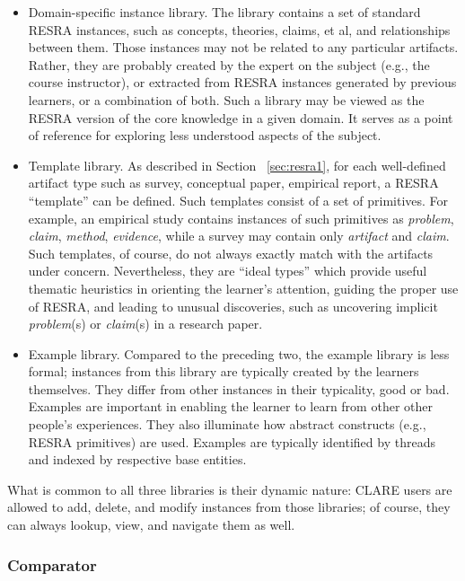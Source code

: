 \begin{itemize}
\item Domain-specific instance library. The library contains a set of
  standard RESRA instances, such as concepts, theories, claims, et al, and
  relationships between them. Those instances may not be related to any
  particular artifacts. Rather, they are probably created by the expert on
  the subject (e.g., the course instructor), or extracted from RESRA
  instances generated by previous learners, or a combination of both. Such
  a library may be viewed as the RESRA version of the core knowledge in a
  given domain.  It serves as a point of reference for exploring less
  understood aspects of the subject.
  
\item Template library. As described in Section ~\ref{sec:resra1}, for
  each well-defined artifact type such as survey, conceptual paper,
  empirical report, a RESRA ``template'' can be defined. Such templates
  consist of a set of primitives. For example, an empirical study contains
  instances of such primitives as {\it problem\/}, {\it claim\/}, {\it
  method\/}, {\it evidence\/}, while a survey may contain only {\it
  artifact\/} and {\it claim\/}. Such templates, of course, do not always
  exactly match with the artifacts under concern.  Nevertheless, they are
  ``ideal types'' which provide useful thematic heuristics in orienting the
  learner's attention, guiding the proper use of RESRA, and leading to
  unusual discoveries, such as uncovering implicit {\it problem\/}(s) or
  {\it claim\/}(s) in a research paper.
  
\item Example library. Compared to the preceding two, the example library
  is less formal; instances from this library are typically created by the
  learners themselves. They differ from other instances in their
  typicality, good or bad. Examples are important in enabling the learner
  to learn from other other people's experiences. They also illuminate how
  abstract constructs (e.g., RESRA primitives) are used.  Examples are
  typically identified by threads and indexed by respective base entities.
\end{itemize}

What is common to all three libraries is their dynamic nature: CLARE users
are allowed to add, delete, and modify instances from those libraries; of
course, they can always lookup, view, and navigate them as well.


\subsubsection{Comparator}

